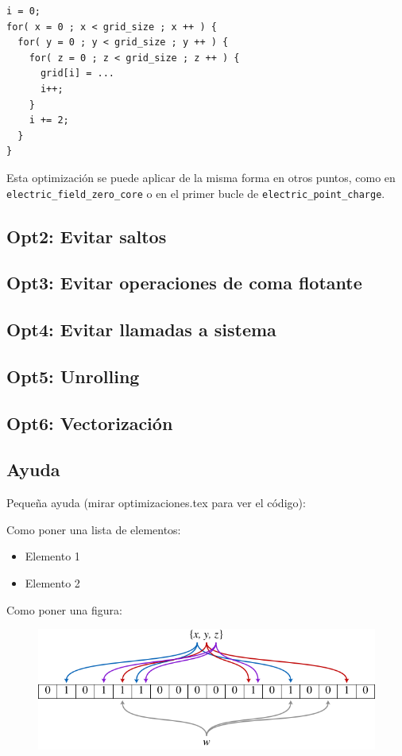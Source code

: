 \begin{lstlisting}[]
i = 0;
for( x = 0 ; x < grid_size ; x ++ ) {
  for( y = 0 ; y < grid_size ; y ++ ) {
    for( z = 0 ; z < grid_size ; z ++ ) {
      grid[i] = ...
      i++;
    }
    i += 2;
  }
}
\end{lstlisting}

Esta optimizaci\'{o}n se puede aplicar de la misma forma en otros puntos, como
en \texttt{electric\_field\_zero\_core} o en el primer bucle de
\texttt{electric\_point\_charge}.

\subsection{Opt2: Evitar saltos}

\subsection{Opt3: Evitar operaciones de coma flotante}

\subsection{Opt4: Evitar llamadas a sistema}

\subsection{Opt5: Unrolling}

\subsection{Opt6: Vectorizaci\'{o}n}

\subsection{Ayuda}

Peque\~{n}a ayuda (mirar optimizaciones.tex para ver el c\'{o}digo):

Como poner una lista de elementos:
\begin{itemize}
   \item Elemento 1
   \item Elemento 2
\end{itemize}

Como poner una figura:
\begin{figure}[ht]
   \centering
   \includegraphics[keepaspectratio=true,width=.6\textwidth]{figures/muestra}
\end{figure}


